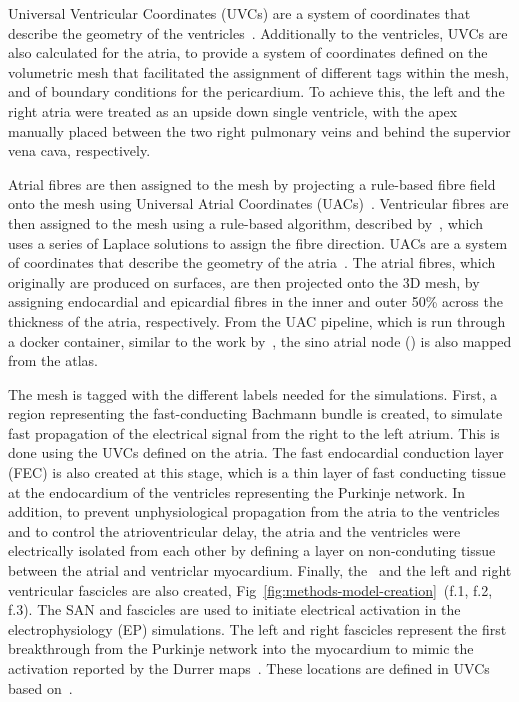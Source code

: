 Universal Ventricular Coordinates (UVCs) are a system of coordinates that 
describe the geometry of the ventricles~\cite{bayer-2018-uvc}.
Additionally to the ventricles, UVCs are also calculated for the atria, 
to provide a system of coordinates defined on the volumetric mesh that facilitated 
the assignment of different tags within the mesh, and of boundary conditions for the 
pericardium.
To achieve this, 
the left and the right atria were treated as an upside down single ventricle, 
with the apex manually placed between the two right pulmonary veins and behind the 
supervior vena cava, respectively. 

Atrial fibres are then assigned to the mesh by projecting a rule-based fibre 
field~\cite{labarthe2016_model}
onto the mesh using Universal Atrial Coordinates (UACs)~\cite{Roney2021-atlas}.
Ventricular fibres are then assigned to the mesh using a rule-based algorithm, 
described by~\cite{bayer2012_fibres},
which uses a series of Laplace solutions to assign the fibre direction.
UACs are a system of coordinates that describe the geometry of the atria~\cite{Roney2021-atlas}.
The atrial fibres, which originally are produced on surfaces, are then projected onto 
the 3D mesh, by assigning endocardial and epicardial fibres in the inner and outer 50\% 
across the thickness of the atria, respectively. 
From the UAC pipeline, which is run through a docker container, similar to the work 
by~\cite{solis-lemus2023_reproducibility}, the sino atrial node (\SAN) is also mapped
from the atlas. 

The mesh is tagged with the different labels needed for the simulations.
First, a region representing the fast-conducting Bachmann bundle is created, 
to simulate fast propagation of the electrical signal from the right to the left atrium. 
This is done using the UVCs defined on the atria.
The fast endocardial conduction layer (FEC) is also created at this stage, 
which is a thin layer of fast conducting tissue at the endocardium of the 
ventricles representing the Purkinje network.
In addition, to prevent unphysiological propagation from the atria to the ventricles and to 
control the atrioventricular delay, 
the atria and the ventricles were electrically isolated from each other by defining a 
layer on non-conduting tissue between the atrial and ventriclar myocardium.
Finally, the \SAN\ and the left and right ventricular fascicles are also created, 
Fig~\ref{fig:methods-model-creation}~(f.1, f.2, f.3). 
The SAN and fascicles are used to initiate electrical activation in the electrophysiology (EP) simulations. 
The left and right fascicles represent the first breakthrough from the Purkinje network into 
the myocardium to mimic the activation reported by the Durrer maps~\cite{durrer-1970-fascicles}. 
These locations are defined in UVCs based on~\cite{gillette_automated_2021}.

